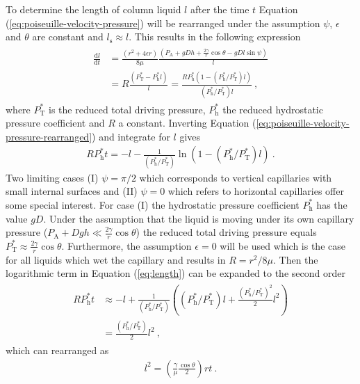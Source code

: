 \documentclass[aip, amsmath, amssymb, reprint, twocolumn, floatfix]{revtex4-1}
\newcommand{\dldt}{\frac{\mathrm{d}l}{\mathrm{d}t}}
\newcommand{\Pa}{P_\mathrm{A}}
\newcommand{\Pt}{P_\mathrm{T}}
\newcommand{\Ph}{P_\mathrm{h}}
\newcommand{\ls}{l_\mathrm{s}}
\begin{document}
To determine the length of column liquid $l$ after the time $t$ Equation (\ref{eq:poiseuille-velocity-pressure}) will be rearranged under the assumption $\psi$, $\epsilon$ and $\theta$ are constant and $\ls \approx l$. This results in the following expression
\begin{gather}
	\begin{aligned}
		\dldt &= \frac{\left(r^2 + 4\epsilon r \right)}{8\mu}\frac{\left(\Pa + gDh + \frac{2\gamma}{r}\cos \theta - gDl \sin \psi \right)}{l}\\
			  &= R \frac{\left(\Pt^* - \Ph^* l\right)}{l} = \frac{R \Ph^* \left( 1 - (\Ph^*/\Pt^*) l\right)}{(\Ph^*/\Pt^*) l}~,
	\end{aligned}
	\label{eq:poiseuille-velocity-pressure-rearranged}
\end{gather}
where $\Pt^*$ is the reduced total driving pressure, $\Ph^*$ the reduced hydrostatic pressure coefficient and $R$ a constant. Inverting Equation (\ref{eq:poiseuille-velocity-pressure-rearranged}) and integrate for $l$ gives
\begin{gather}
	R \Ph^* t = - l - \frac{1}{(\Ph^*/\Pt^*)} \ln\left(1- (\Ph^*/\Pt^*) l \right)~.
	\label{eq:length}
\end{gather}
Two limiting cases (I) $\psi = \pi/2$ which corresponds to vertical capillaries with small internal surfaces and (II) $\psi = 0$ which refers to horizontal capillaries offer some special interest. For case (I) the hydrostatic pressure coefficient $\Ph^*$ has the value $gD$. Under the assumption that the liquid is moving under its own capillary pressure ($\Pa + Dgh \ll \frac{2\gamma}{r}\cos \theta$) the reduced total driving pressure equals $\Pt^* \approx \frac{2\gamma}{r}\cos \theta$. Furthermore, the assumption $\epsilon = 0$ will be used which is the case for all liquids which wet the capillary and results in $R = r^2/8\mu$. Then the logarithmic term in Equation (\ref{eq:length}) can be expanded to the second order
\begin{gather}
	\begin{aligned}
		R \Ph^* t &\approx - l + \frac{1}{(\Ph^*/\Pt^*)} \left((\Ph^*/\Pt^*) l + \frac{(\Ph^*/\Pt^*)^2}{2} l^2 \right) \\
				  &= \frac{(\Ph^*/\Pt^*)}{2} l^2~,
	\end{aligned}
	\label{eq:length-expanded}
\end{gather}
which can rearranged as
\begin{gather}
	\boxed{l^2 = \left(\frac{\gamma}{\mu}\frac{\cos \theta}{2}\right)rt}~.
	\label{eq:BCLW-Imbibition}
\end{gather}
\end{document}
